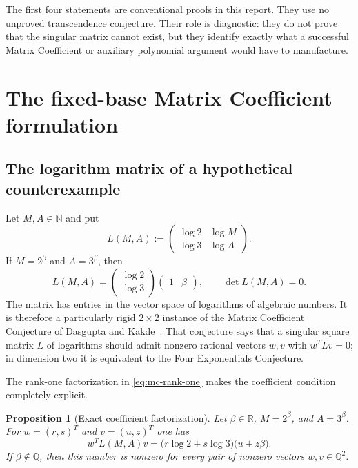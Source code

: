 \documentclass[11pt,oneside]{article}
\newtheorem{proposition}[theorem]{Proposition}
\theoremstyle{definition}
\theoremstyle{remark}
\newcommand{\N}{\mathbb N}
\newcommand{\Q}{\mathbb Q}
\newcommand{\R}{\mathbb R}
\begin{document}
The first four statements are conventional proofs in this report.  They use no unproved
transcendence conjecture.  Their role is diagnostic: they do not prove that the singular matrix
cannot exist, but they identify exactly what a successful Matrix Coefficient or auxiliary
polynomial argument would have to manufacture.

\section{The fixed-base Matrix Coefficient formulation}
\label{sec:matrix-coefficient}

\subsection{The logarithm matrix of a hypothetical counterexample}

Let $M,A\in\N$ and put
\begin{equation}
 L(M,A):=
 \begin{pmatrix}
  \log2 & \log M\\
  \log3 & \log A
 \end{pmatrix}.
 \label{eq:mc-log-matrix}
\end{equation}
If $M=2^\beta$ and $A=3^\beta$, then
\begin{equation}
 L(M,A)=
 \begin{pmatrix}\log2\\ \log3\end{pmatrix}
 \begin{pmatrix}1&\beta\end{pmatrix},
 \qquad
 \det L(M,A)=0.
 \label{eq:mc-rank-one}
\end{equation}
The matrix has entries in the vector space of logarithms of algebraic numbers.  It is therefore
a particularly rigid $2\times2$ instance of the Matrix Coefficient Conjecture of
Dasgupta and Kakde~\cite{DasguptaKakdeMCC}.  That conjecture says that a singular square
matrix $L$ of logarithms should admit nonzero rational vectors $w,v$ with
$w^TLv=0$; in dimension two it is equivalent to the Four Exponentials Conjecture.

The rank-one factorization in \eqref{eq:mc-rank-one} makes the coefficient condition completely
explicit.

\begin{proposition}[Exact coefficient factorization]
\label{prop:mc-factorization}
Let $\beta\in\R$, $M=2^\beta$, and $A=3^\beta$.  For
$w=(r,s)^T$ and $v=(u,z)^T$ one has
\begin{equation}
 w^T L(M,A)v
 =\bigl(r\log2+s\log3\bigr)\bigl(u+z\beta\bigr).
 \label{eq:mc-coefficient-product}
\end{equation}
If $\beta\notin\Q$, then this number is nonzero for every pair of nonzero vectors
$w,v\in\Q^2$.
\end{proposition}
\end{document}
